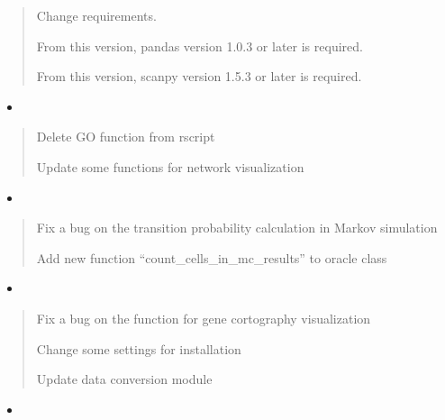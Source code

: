 \documentclass[letterpaper,10pt,english]{sphinxmanual}
\begin{document}
\begin{quote}

\sphinxtitleref{\sphinxhyphen{}} Change requirements.

\sphinxtitleref{\sphinxhyphen{}} From this version, pandas version 1.0.3 or later is required.

\sphinxtitleref{\sphinxhyphen{}} From this version, scanpy version 1.5.3 or later is required.
\end{quote}
\begin{itemize}
\item {} 

\end{itemize}
\begin{quote}

\sphinxtitleref{\sphinxhyphen{}} Delete GO function from r\sphinxhyphen{}script

\sphinxtitleref{\sphinxhyphen{}} Update some functions for network visualization
\end{quote}
\begin{itemize}
\item {} 

\end{itemize}
\begin{quote}

\sphinxtitleref{\sphinxhyphen{}} Fix a bug on the transition probability calculation in Markov simulation

\sphinxtitleref{\sphinxhyphen{}} Add new function “count\_cells\_in\_mc\_results” to oracle class
\end{quote}
\begin{itemize}
\item {} 

\end{itemize}
\begin{quote}

\sphinxtitleref{\sphinxhyphen{}} Fix a bug on the function for gene cortography visualization

\sphinxtitleref{\sphinxhyphen{}} Change some settings for installation

\sphinxtitleref{\sphinxhyphen{}} Update data conversion module
\end{quote}
\begin{itemize}
\item {} 

\end{itemize}
\end{document}
